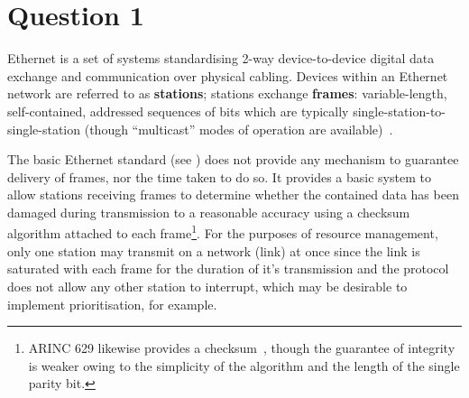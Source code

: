 \section{Question 1}


%

Ethernet is a set of systems standardising 2-way device-to-device digital data exchange and communication over physical cabling.
Devices within an Ethernet network are referred to as \textbf{stations}; stations exchange \textbf{frames}: variable-length, self-contained, addressed sequences of bits which are typically single-station-to-single-station (though ``multicast'' modes of operation are available)~\cite{IEEEStandardEthernet2022}\cite{spurgeonEthernetDefinitiveGuide2000}.

The basic Ethernet standard (see \cite{IEEEStandardEthernet2022}) does not provide any mechanism to guarantee delivery of frames, nor the time taken to do so.
It provides a basic system to allow stations receiving frames to determine whether the contained data has been damaged during transmission to a reasonable accuracy using a checksum algorithm attached to each frame\footnote{ARINC 629 likewise provides a checksum~\cite{dheerajpuniaARINC629Digital2021}, though the guarantee of integrity is weaker owing to the simplicity of the algorithm and the length of the single parity bit.}.
For the purposes of resource management, only one station may transmit on a network (link) at once since the link is saturated with each frame for the duration of it's transmission and the protocol does not allow any other station to interrupt, which may be desirable to implement prioritisation, for example.

